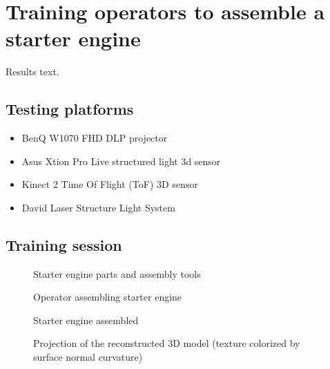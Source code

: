 \section{Training operators to assemble a starter engine}\label{sec:results}

Results text.

\subsection{Testing platforms}

\begin{itemize}
	\item BenQ W1070 FHD DLP projector
	\item Asus Xtion Pro Live structured light 3d sensor
	\item Kinect 2 Time Of Flight (ToF) 3D sensor
	\item David Laser Structure Light System
\end{itemize}



\subsection{Training session}

\begin{figure}[H]
	\begin{floatrow}[2]
		{\caption{Starter engine parts and assembly tools}\label{fig:assembly-parts}}
		{\caption{Operator assembling starter engine}\label{fig:assembled-object}}
	\end{floatrow}
\end{figure}

\begin{figure}[H]
	\begin{floatrow}[2]
		{\caption{Starter engine assembled}\label{fig:assembled-object}}
		{\caption{Projection of the reconstructed 3D model (texture colorized by surface normal curvature)}\label{fig:projection-mapping-1}}
	\end{floatrow}
\end{figure}

